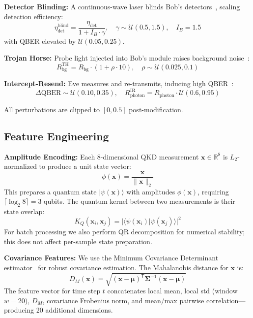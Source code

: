 \documentclass[conference,10pt]{IEEEtran}
\begin{document}
\textbf{Detector Blinding:} A continuous-wave laser blinds Bob's detectors~\cite{makarov2006detector}, scaling detection efficiency:
\begin{equation}
\eta_{\text{det}}^{\text{blind}} = \frac{\eta_{\text{det}}}{1 + I_B \cdot \gamma}, \quad \gamma \sim \mathcal{U}(0.5, 1.5), \quad I_B = 1.5
\end{equation}
with QBER elevated by $\mathcal{U}(0.05, 0.25)$.

\textbf{Trojan Horse:} Probe light injected into Bob's module raises background noise~\cite{gisin2006trojan}:
\begin{equation}
R_{\text{bg}}^{\text{TH}} = R_{\text{bg}} \cdot \left(1 + \rho \cdot 10\right), \quad \rho \sim \mathcal{U}(0.025, 0.1)
\end{equation}

\textbf{Intercept-Resend:} Eve measures and re-transmits, inducing high QBER~\cite{bennett1992experimental}:
\begin{equation}
\Delta\text{QBER} \sim \mathcal{U}(0.10, 0.35), \quad R_{\text{photon}}^{\text{IR}} = R_{\text{photon}} \cdot \mathcal{U}(0.6, 0.95)
\end{equation}

All perturbations are clipped to $[0, 0.5]$ post-modification.

\subsection{Feature Engineering}

\textbf{Amplitude Encoding:} Each 8-dimensional QKD measurement $\mathbf{x} \in \mathbb{R}^8$ is $L_2$-normalized to produce a unit state vector:
\begin{equation}
\phi(\mathbf{x}) = \frac{\mathbf{x}}{\|\mathbf{x}\|_2}
\end{equation}
This prepares a quantum state $|\psi(\mathbf{x})\rangle$ with amplitudes $\phi(\mathbf{x})$, requiring $\lceil \log_2 8 \rceil = 3$ qubits. The quantum kernel between two measurements is their state overlap:
\begin{equation}
K_Q(\mathbf{x}_i, \mathbf{x}_j) = |\langle\psi(\mathbf{x}_i) | \psi(\mathbf{x}_j)\rangle|^2
\end{equation}
For batch processing we also perform QR decomposition for numerical stability; this does not affect per-sample state preparation.

\textbf{Covariance Features:} We use the Minimum Covariance Determinant estimator~\cite{rousseeuw1999fast} for robust covariance estimation. The Mahalanobis distance for $\mathbf{x}$ is:
\begin{equation}
D_M(\mathbf{x}) = \sqrt{(\mathbf{x} - \boldsymbol{\mu})^\mathsf{T} \boldsymbol{\Sigma}^{-1} (\mathbf{x} - \boldsymbol{\mu})}
\end{equation}
The feature vector for time step $t$ concatenates local mean, local std (window $w=20$), $D_M$, covariance Frobenius norm, and mean/max pairwise correlation---producing 20 additional dimensions.
\end{document}
